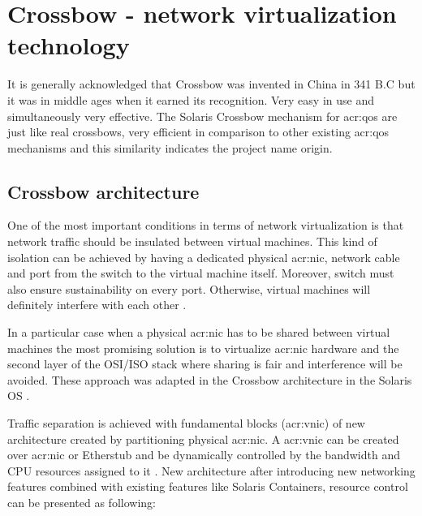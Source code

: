 \documentclass[11pt]{book}
\begin{document}
    \section{Crossbow - network virtualization technology}
    \label{sec:sol:xbow}


      It is generally acknowledged that Crossbow was invented in China in 341 B.C but it was in middle ages when it
      earned its recognition. Very easy in use and simultaneously very effective. The Solaris Crossbow mechanism for
      \gls{acr:qos} are just like real crossbows, very efficient in comparison to other existing \gls{acr:qos}
      mechanisms and this similarity indicates the project name origin.


      \subsection{Crossbow architecture}

        One of the most important conditions in terms of network virtualization is that network traffic should be
        insulated between virtual machines. This kind of isolation can be achieved by having a dedicated physical
        \gls{acr:nic}, network cable and port from the switch to the virtual machine itself. Moreover, switch must also
        ensure sustainability on every port. Otherwise, virtual machines will definitely interfere with each other
        \cite{crossbow}.
        
        In a particular case when a physical \gls{acr:nic} has to be shared between virtual machines the most promising
        solution is to virtualize \gls{acr:nic} hardware and the second layer of the OSI/ISO stack where sharing is fair
        and interference will be avoided. These approach was adapted in the Crossbow architecture in the Solaris OS
        \cite{crossbow}.
        
        Traffic separation is achieved with fundamental blocks (\gls{acr:vnic}) of new architecture created by
        partitioning physical \gls{acr:nic}. A \gls{acr:vnic} can be created over \gls{acr:nic} or Etherstub and be
        dynamically controlled by the bandwidth and CPU resources assigned to it \cite{crossbow,network_virtualization}.
        New architecture after introducing new networking features combined with existing features like Solaris
        Containers, resource control can be presented as following:
\end{document}
